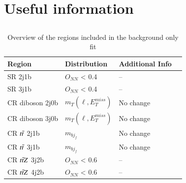 \chapter{Useful information}
\label{sec:app}

\section*{}

\begin{table}[h!]
     \centering
      \begin{tabular}{@{} *4l  @{}}
      \toprule
      Region & Distribution & Additional Info  \\
     \midrule
      SR 2j1b & $O_{NN}$ < 0.4 & {--}\\[0.2ex]
      SR 3j1b & $O_{NN}$ < 0.4 & {--}\\[0.2ex]
      CR diboson 2j0b & $m_{T}(\ell,E_{T}^{miss})$ & No change \\[0.2ex]
      CR diboson 3j0b & $m_{T}(\ell,E_{T}^{miss})$ & No change \\[0.2ex]
      CR $t\Bar{t}$ 2j1b & $m_{bj_{f}}$ & No change \\[0.2ex]
      CR $t\Bar{t}$ 3j1b & $m_{bj_{f}}$ & No change \\[0.2ex]
      CR $t\Bar{t}Z$ 3j2b & $O_{NN}$ < 0.6 & {--}\\[0.2ex]
      CR $t\Bar{t}Z$ 4j2b & $O_{NN}$ < 0.6 & {--}\\[0.2ex]
      \bottomrule
 \end{tabular}
 \caption{Overview of the regions included in the background only fit}
 \label{tab:backgroundonlyfit}
 \end{table}
 
